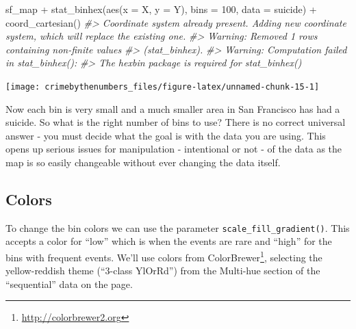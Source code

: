 \documentclass[
]{krantz}
\makeatletter
\newenvironment{Shaded}{\begin{snugshade}}{\end{snugshade}}
\newcommand{\AttributeTok}[1]{\textcolor[rgb]{0.61,0.61,0.61}{#1}}
\newcommand{\CommentTok}[1]{\textcolor[rgb]{0.37,0.37,0.37}{\textit{#1}}}
\newcommand{\DecValTok}[1]{\textcolor[rgb]{0.06,0.06,0.06}{#1}}
\newcommand{\FunctionTok}[1]{\textcolor[rgb]{0,0,0}{#1}}
\newcommand{\NormalTok}[1]{#1}
\newcommand{\SpecialCharTok}[1]{\textcolor[rgb]{0,0,0}{#1}}
\renewcommand{\href}[2]{#2\footnote{\url{#1}}}
\newenvironment{kframe}{%
\medskip{}
\setlength{\fboxsep}{.8em}
 \def\at@end@of@kframe{}%
 \ifinner\ifhmode%
  \def\at@end@of@kframe{\end{minipage}}%
  \begin{minipage}{\columnwidth}%
 \fi\fi%
 \def\FrameCommand##1{\hskip\@totalleftmargin \hskip-\fboxsep
 \colorbox{shadecolor}{##1}\hskip-\fboxsep
     \hskip-\linewidth \hskip-\@totalleftmargin \hskip\columnwidth}%
 \MakeFramed {\advance\hsize-\width
   \@totalleftmargin\z@ \linewidth\hsize
   \@setminipage}}%
 {\par\unskip\endMakeFramed%
 \at@end@of@kframe}
\renewenvironment{Shaded}{\begin{kframe}}{\end{kframe}}
\makeatother
\begin{document}
\begin{Shaded}
\begin{Highlighting}[]
\NormalTok{sf\_map }\SpecialCharTok{+} \FunctionTok{stat\_binhex}\NormalTok{(}\FunctionTok{aes}\NormalTok{(}\AttributeTok{x =}\NormalTok{ X, }\AttributeTok{y =}\NormalTok{ Y), }\AttributeTok{bins =} \DecValTok{100}\NormalTok{, }\AttributeTok{data =}\NormalTok{ suicide) }\SpecialCharTok{+}
  \FunctionTok{coord\_cartesian}\NormalTok{()}
\CommentTok{\#\textgreater{} Coordinate system already present. Adding new coordinate system, which will replace the existing one.}
\CommentTok{\#\textgreater{} Warning: Removed 1 rows containing non{-}finite values}
\CommentTok{\#\textgreater{} (stat\_binhex).}
\CommentTok{\#\textgreater{} Warning: Computation failed in \textasciigrave{}stat\_binhex()\textasciigrave{}:}
\CommentTok{\#\textgreater{} The \textasciigrave{}hexbin\textasciigrave{} package is required for \textasciigrave{}stat\_binhex()\textasciigrave{}}
\end{Highlighting}
\end{Shaded}

\begin{center}\texttt{[image: crimebythenumbers\_files/figure-latex/unnamed-chunk-15-1]} \end{center}

Now each bin is very small and a much smaller area in San Francisco has had a suicide. So what is the right number of bins to use? There is no correct universal answer - you must decide what the goal is with the data you are using. This opens up serious issues for manipulation - intentional or not - of the data as the map is so easily changeable without ever changing the data itself.

\hypertarget{colors}{%
\subsection{Colors}\label{colors}}

To change the bin colors we can use the parameter \texttt{scale\_fill\_gradient()}. This accepts a color for ``low'' which is when the events are rare and ``high'' for the bins with frequent events. We'll use colors from \href{http://colorbrewer2.org}{ColorBrewer}, selecting the yellow-reddish theme (``3-class YlOrRd'') from the Multi-hue section of the ``sequential'' data on the page.
\end{document}
